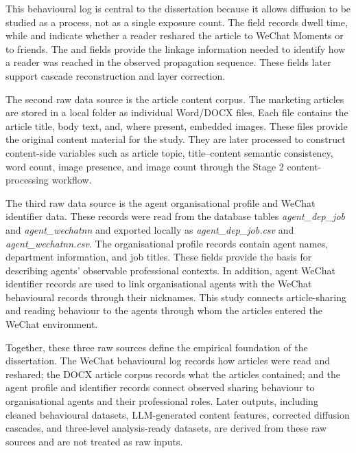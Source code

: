 This behavioural log is central to the dissertation because it allows diffusion to be studied as a process, not as a single exposure count. The  field records dwell time, while  and  indicate whether a reader reshared the article to WeChat Moments or to friends. The  and  fields provide the linkage information needed to identify how a reader was reached in the observed propagation sequence. These fields later support cascade reconstruction and layer correction.

The second raw data source is the article content corpus. The marketing articles are stored in a local folder as individual Word/DOCX files. Each file contains the article title, body text, and, where present, embedded images. These files provide the original content material for the study. They are later processed to construct content-side variables such as article topic, title–content semantic consistency, word count, image presence, and image count through the Stage 2 content-processing workflow.

The third raw data source is the agent organisational profile and WeChat identifier data. These records were read from the database tables \emph{agent\_dep\_job} and \emph{agent\_wechatnn} and exported locally as \emph{agent\_dep\_job.csv} and \emph{agent\_wechatnn.csv}. The organisational profile records contain agent names, department information, and job titles. These fields provide the basis for describing agents’ observable professional contexts. In addition, agent WeChat identifier records are used to link organisational agents with the WeChat behavioural records through their nicknames. This study connects article-sharing and reading behaviour to the agents through whom the articles entered the WeChat environment.

Together, these three raw sources define the empirical foundation of the dissertation. The WeChat behavioural log records how articles were read and reshared; the DOCX article corpus records what the articles contained; and the agent profile and identifier records connect observed sharing behaviour to organisational agents and their professional roles. Later outputs, including cleaned behavioural datasets, LLM-generated content features, corrected diffusion cascades, and three-level analysis-ready datasets, are derived from these raw sources and are not treated as raw inputs.

